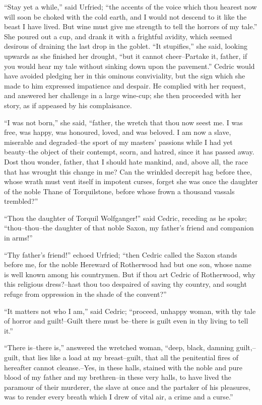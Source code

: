 ``Stay yet a while,'' said Urfried; ``the accents of the voice which
thou hearest now will soon be choked with the cold earth, and I would
not descend to it like the beast I have lived. But wine must give me
strength to tell the horrors of my tale.'' She poured out a cup, and
drank it with a frightful avidity, which seemed desirous of draining the
last drop in the goblet. ``It stupifies,'' she said, looking upwards as
she finished her drought, ``but it cannot cheer--Partake it, father, if
you would hear my tale without sinking down upon the pavement.'' Cedric
would have avoided pledging her in this ominous conviviality, but the
sign which she made to him expressed impatience and despair. He complied
with her request, and answered her challenge in a large wine-cup; she
then proceeded with her story, as if appeased by his complaisance.

``I was not born,'' she said, ``father, the wretch that thou now seest
me. I was free, was happy, was honoured, loved, and was beloved. I am
now a slave, miserable and degraded--the sport of my masters' passions
while I had yet beauty--the object of their contempt, scorn, and hatred,
since it has passed away. Dost thou wonder, father, that I should hate
mankind, and, above all, the race that has wrought this change in me?
Can the wrinkled decrepit hag before thee, whose wrath must vent itself
in impotent curses, forget she was once the daughter of the noble Thane
of Torquilstone, before whose frown a thousand vassals trembled?''

``Thou the daughter of Torquil Wolfganger!'' said Cedric, receding as he
spoke; ``thou--thou--the daughter of that noble Saxon, my father's
friend and companion in arms!''

``Thy father's friend!'' echoed Urfried; ``then Cedric called the Saxon
stands before me, for the noble Hereward of Rotherwood had but one son,
whose name is well known among his countrymen. But if thou art Cedric of
Rotherwood, why this religious dress?--hast thou too despaired of saving
thy country, and sought refuge from oppression in the shade of the
convent?''

``It matters not who I am,'' said Cedric; ``proceed, unhappy woman, with
thy tale of horror and guilt!--Guilt there must be--there is guilt even
in thy living to tell it.''

``There is--there is,'' answered the wretched woman, ``deep, black,
damning guilt,--guilt, that lies like a load at my breast--guilt, that
all the penitential fires of hereafter cannot cleanse.--Yes, in these
halls, stained with the noble and pure blood of my father and my
brethren--in these very halls, to have lived the paramour of their
murderer, the slave at once and the partaker of his pleasures, was to
render every breath which I drew of vital air, a crime and a curse.''

